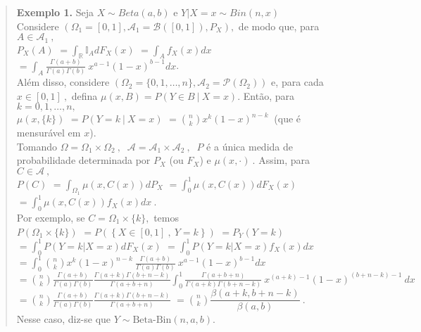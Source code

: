 \documentclass[
]{book}
\begin{document}
\begin{quote}
\textbf{Exemplo 1.} Seja \(X \sim Beta(a,b)\) e \(Y|X=x \sim Bin(n,x)\)\\
\(~\)\\
Considere \(\left(\Omega_1=[0,1],\mathcal{A}_1=\mathcal{B}([0,1]),P_X\right),\) de modo que, para \(A \in \mathcal{A}_1~,\)\\
\(P_X(A)\) \(=\displaystyle\int_{\mathbb{R}}\mathbb{I}_A dF_X(x)\) \(=\displaystyle\int_A f_X(x)dx\) \(=\displaystyle\int_A \tfrac{\Gamma(a+b)}{\Gamma(a)\Gamma(b)}~x^{a-1}(1-x)^{b-1}dx\).\\
Além disso, considere \(\left(\Omega_2=\{0,1,\ldots,n\}, \mathcal{A}_2=\mathcal{P}(\Omega_2)\right)\) e, para cada \(x \in [0,1]~,\) defina \(\mu(x,B)=P(Y \in B~|~ X=x).\) Então, para \(k=0,1,\ldots,n,\)\\
\(\mu\left(x,\{k\}\right)\) \(=P(Y=k~|~ X=x)\) \(=\displaystyle\binom{n}{k}x^k(1-x)^{n-k}~\) (que é mensurável em \(x\)).\\
Tomando \(\Omega=\Omega_1 \times \Omega_2~,~\) \(\mathcal{A}=\mathcal{A}_1 \times \mathcal{A}_2~,~\) \(P\) é a única medida de probabilidade determinada por \(P_X\) (ou \(F_X\)) e \(\mu(x,\cdot)~.\) Assim, para \(C \in \mathcal{A}~,\)\\
\(P(C)\) \(=\displaystyle\int_{\Omega_1}\mu\left(x,C(x)\right)dP_X\) \(=\displaystyle\int_0^1 \mu\left(x,C(x)\right)dF_X(x)\) \(=\displaystyle\int_0^1 \mu\left(x,C(x)\right)f_X(x)dx~.\)\\
\(~\)\\
Por exemplo, se \(C=\Omega_1 \times \{k\},\) temos\\
\(P\left(\Omega_1 \times \{k\}\right)\)
\(=P\left(\left\{X\in[0,1]~,~Y=k\right\}\right)\)
\(=P_Y\left(Y=k\right)\)
\(=\displaystyle\int_0^1P(Y=k|X=x)dF_X(x)\)
\(=\displaystyle\int_0^1P(Y=k|X=x)f_X(x)dx\)
\(=\displaystyle\int_0^1 \binom{n}{k}x^k(1-x)^{n-k} ~\tfrac{\Gamma(a+b)}{\Gamma(a)\Gamma(b)}~x^{a-1}(1-x)^{b-1}dx\)
\(=\displaystyle\binom{n}{k}\tfrac{\Gamma(a+b)}{\Gamma(a)\Gamma(b)}\tfrac{\Gamma(a+k)\Gamma(b+n-k)}{\Gamma(a+b+n)}\int_0^1\tfrac{\Gamma(a+b+n)}{\Gamma(a+k)\Gamma(b+n-k)}~x^{(a+k)-1}(1-x)^{(b+n-k)-1}~dx\)
\(=\displaystyle\binom{n}{k}\tfrac{\Gamma(a+b)}{\Gamma(a)\Gamma(b)}\tfrac{\Gamma(a+k)\Gamma(b+n-k)}{\Gamma(a+b+n)}\)
\(=\displaystyle\binom{n}{k}\dfrac{\beta(a+k,b+n-k)}{\beta(a,b)}~.\)\\
\(~\)\\
Nesse caso, diz-se que \(Y \sim \text{Beta-Bin}(n,a,b)\).
\end{quote}
\end{document}
